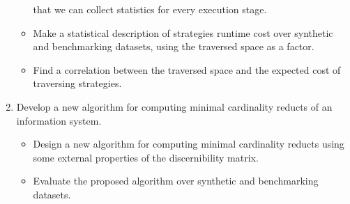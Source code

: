 \documentclass[authoryear,11pt]{elsarticle}
\begin{document}
\begin{enumerate}
\begin{itemize}
  			  that we can collect statistics for every execution stage.
  		\item Make a statistical description  of strategies runtime cost over synthetic and benchmarking datasets,
  			  using the traversed space as a factor.
  		\item Find a correlation between the traversed space and the expected cost of traversing strategies.
  	\end{itemize}
  	\item Develop a new algorithm for computing minimal cardinality reducts of an information system.
  	\begin{itemize}
  		\item Design a new algorithm for computing minimal cardinality reducts using some external
  		      properties of the discernibility matrix.
  		\item Evaluate the proposed algorithm over synthetic and benchmarking datasets.
  	\end{itemize}
\end{enumerate}
	  	
\end{document}
